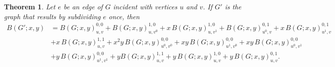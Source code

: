 \documentclass[10pt,a4paper]{amsart}
\newtheorem{theorem}{Theorem}
\begin{document}
\begin{theorem}
Let $e$ be an edge of $G$ incident with vertices $u$ and $v$. If $G'$ is the graph that results by subdividing  $e$ once, then
\begin{equation}
\begin{aligned}
\nonumber
B(G';x,y) & = B(G;x,y)^{0,0}_{u,v}+B(G;x,y)^{1,0}_{u,v^{0}}+x\,B(G;x,y)^{1,0}_{u,v^{1}}
+ B(G;x,y)^{0,1}_{u^{0},v}+x\,B(G;x,y)^{0,1}_{u^{1},v}\\
           &+x\,B(G;x,y)^{1,1}_{u,v}+x^{2}y\,B(G;x,y)^{0,0}_{u^{0},v^{0}}+xy\,B(G;x,y)^{0,0}_{u^{1},v^{0}}+
xy\,B(G;x,y)^{0,0}_{u^{0},v^{1}}\\
           & +y\,B(G;x,y)^{0,0}_{u^{1},v^{1}}+yB(G;x,y)^{1,1}_{u,v}+
y\,B(G;x,y)^{1,0}_{u,v}+y\,B(G;x,y)^{0,1}_{u,v}.
\end{aligned}
\end{equation}
\end{theorem}
\end{document}
